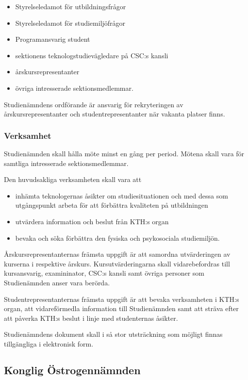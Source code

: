 \documentclass{dgovdoc}
\begin{document}
\begin{itemize}
  \item Styrelseledamot för utbildningsfrågor
  \item Styrelseledamot för studiemiljöfrågor
  \item Programansvarig student
  \item sektionens teknologstudievägledare på CSC:s kansli
  \item årskursrepresentanter
  \item övriga intresserade sektionsmedlemmar.
\end{itemize}

Studienämndens ordförande är ansvarig för rekryteringen av årskursrepresentanter och studentrepresentanter när vakanta platser finns.

\subsubsection{Verksamhet}

Studienämnden skall hålla möte minst en gång per period. Mötena skall vara för samtliga intresserade sektionsmedlemmar.

Den huvudsakliga verksamheten skall vara att

\begin{itemize}
  \item inhämta teknologernas åsikter om studiesituationen och med dessa som utgångspunkt arbeta för att förbättra kvaliteten på utbildningen
  \item utvärdera information och beslut från KTH:s organ
  \item bevaka och söka förbättra den fysiska och psykosociala studiemiljön.
\end{itemize}

Årskursrepresentanternas främsta uppgift är att samordna utvärderingen av kurserna i respektive årskurs. Kursutvärderingarna skall vidarebefordras till kursansvarig, examininator, CSC:s kansli samt övriga personer som Studienämnden anser vara berörda.

Studentrepresentanternas främsta uppgift är att bevaka verksamheten i KTH:s organ, att vidareförmedla information till Studienämnden samt att sträva efter att påverka KTH:s beslut i linje med studenternas åsikter.

Studienämndens dokument skall i så stor utsträckning som möjligt finnas tillgängliga i elektronisk form.

\subsection{Konglig Östrogennämnden}
\end{document}

